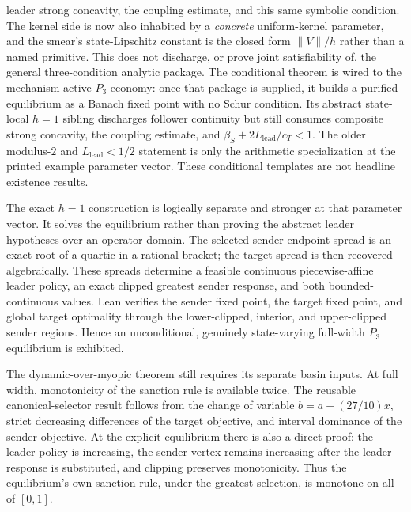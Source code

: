 leader strong concavity, the coupling estimate, and this same symbolic condition.
The kernel side is now also inhabited by a \emph{concrete}
uniform-kernel parameter, and the smear's state-Lipschitz constant is the closed
form $\|V\|/h$ rather than a named primitive. This does not discharge, or prove
joint satisfiability of, the general three-condition analytic package. The
conditional theorem is wired to the mechanism-active $P_3$ economy: once that
package is supplied, it builds a purified equilibrium as a Banach fixed point
with no Schur condition. Its abstract state-local $h=1$ sibling discharges follower
continuity but still consumes composite strong concavity, the coupling estimate,
and \(\beta_S+2L_{\mathrm{lead}}/c_T<1\). The older modulus-\(2\) and
\(L_{\mathrm{lead}}<1/2\) statement is only the arithmetic specialization at
the printed example parameter vector. These conditional templates are not headline existence
results.

The exact $h=1$ construction is logically separate and stronger at that
parameter vector. It solves the equilibrium rather than proving the abstract
leader hypotheses over an operator domain. The selected sender endpoint spread
is an exact root of a quartic in a rational bracket; the target spread is then
recovered algebraically. These spreads determine a feasible continuous
piecewise-affine leader policy, an exact clipped greatest sender response, and
both bounded-continuous values. Lean verifies the sender fixed point, the target
fixed point, and global target optimality through the lower-clipped, interior,
and upper-clipped sender regions. Hence an unconditional, genuinely
state-varying full-width $P_3$ equilibrium is exhibited.

The dynamic-over-myopic theorem still requires its separate basin inputs.
At full width, monotonicity of the sanction rule is available twice. The reusable
canonical-selector result follows from the change of variable
$b=a-(27/10)x$, strict decreasing differences of the target objective, and
interval dominance of the sender objective. At the explicit equilibrium there
is also a direct proof: the leader policy is increasing, the sender vertex
remains increasing after the leader response is substituted, and clipping
preserves monotonicity. Thus the equilibrium's own sanction rule, under the greatest selection, is
monotone on all of $[0,1]$.

